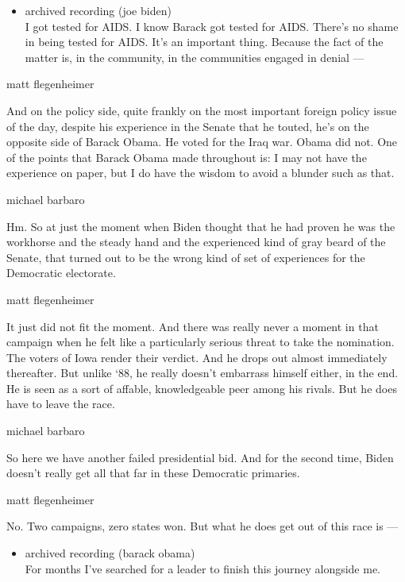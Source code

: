 \begin{itemize}
\tightlist
\item
  archived recording (joe biden)\\
  I got tested for AIDS. I know Barack got tested for AIDS. There's no
  shame in being tested for AIDS. It's an important thing. Because the
  fact of the matter is, in the community, in the communities engaged in
  denial ---
\end{itemize}

matt flegenheimer

And on the policy side, quite frankly on the most important foreign
policy issue of the day, despite his experience in the Senate that he
touted, he's on the opposite side of Barack Obama. He voted for the Iraq
war. Obama did not. One of the points that Barack Obama made throughout
is: I may not have the experience on paper, but I do have the wisdom to
avoid a blunder such as that.

michael barbaro

Hm. So at just the moment when Biden thought that he had proven he was
the workhorse and the steady hand and the experienced kind of gray beard
of the Senate, that turned out to be the wrong kind of set of
experiences for the Democratic electorate.

matt flegenheimer

It just did not fit the moment. And there was really never a moment in
that campaign when he felt like a particularly serious threat to take
the nomination. The voters of Iowa render their verdict. And he drops
out almost immediately thereafter. But unlike `88, he really doesn't
embarrass himself either, in the end. He is seen as a sort of affable,
knowledgeable peer among his rivals. But he does have to leave the race.

michael barbaro

So here we have another failed presidential bid. And for the second
time, Biden doesn't really get all that far in these Democratic
primaries.

matt flegenheimer

No. Two campaigns, zero states won. But what he does get out of this
race is ---

\begin{itemize}
\tightlist
\item
  archived recording (barack obama)\\
  For months I've searched for a leader to finish this journey alongside
  me.
\end{itemize}

